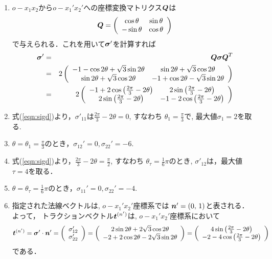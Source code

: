 \documentclass[10pt,a4j]{jarticle}
\begin{document}
\begin{enumerate}
\item
$o-x_1x_2$から$o-x_1'x_2'$への座標変換マトリクス$\mbox{\boldmath $Q$}$は
\[
	\mbox{\boldmath $Q$}=\left(
		\begin{array}{cc}
			\cos \theta & \sin \theta \\
			-\sin\theta & \cos \theta
		\end{array}
	\right)
\]
で与えられる．これを用いて$\mbox{\boldmath $\sigma$}'$を計算すれば
\begin{eqnarray}
	\mbox{\boldmath $\sigma$} ' 
	&=& 
	\mbox{\boldmath $Q \sigma Q$}^T\\
	&=&
	2
 	\left( 
 	\begin{array}{cc}
		-1- \cos 2\theta+\sqrt{3} \sin 2 \theta & 
		\sin 2\theta +\sqrt{3} \cos 2\theta \\
		\sin 2\theta +\sqrt{3} \cos 2\theta &
		-1+ \cos 2\theta-\sqrt{3} \sin 2 \theta 
	\end{array}
	\right) \\
 &=&
 2
 \left(
 	\begin{array}{cc}
		-1+ 2 \cos \left( \frac{2\pi}{3} -2\theta\right) & 
		2\sin \left(\frac{2\pi}{3} -2 \theta\right) \\
		2\sin \left(\frac{2\pi}{3} -2 \theta\right) &
		-1- 2 \cos \left( \frac{2\pi}{3} -2\theta\right)   \\
 	\end{array}
 \right)
	\label{eqn:sigd}
\end{eqnarray}
\item
	式(\ref{eqn:sigd})より，$\sigma'_{11}$は$\frac{2\pi}{3} -2\theta=0$, すなわち
	$\theta_1=\frac{\pi}{3}$で, 最大値$\sigma_1=2$を取る.
\item
	$\theta=\theta_1=\frac{\pi}{3}$のとき，$\sigma_{12}'=0,\sigma_{22}'=-6$.
\item
	式(\ref{eqn:sigd})より，$\frac{2\pi}{3}-2\theta=\frac{\pi}{2}$, すなわち
	$\theta_\tau=\frac{1}{6}\pi$のとき, $\sigma'_{12}$は，最大値$\tau=4$を取る．
\item
	$\theta=\theta_{\tau}=\frac{1}{6}\pi$のとき，$\sigma_{11}'=0,\sigma_{22}'=-4$.
\item
	指定された法線ベクトルは, $o-x_1'x_2'$座標系では
	$\mbox{\boldmath $n$}'=(0,\, 1)$と表される． よって，
	トラクションベクトル$\mbox{\boldmath $t$}^{(n')}$は, $o-x_1'x_2'$座標系において
	\begin{equation}
		\mbox{\boldmath $t$}^{(n')}= \mbox{\boldmath $\sigma$}' \cdot \mbox{\boldmath $n$}'
		= 
		\left( 
			\begin{array}{c} 
				\sigma_{12}' \\ 
				\sigma_{22}'
			\end{array}
		\right)
		=
		\left(
			\begin{array}{c}
				2\sin 2\theta +2\sqrt{3} \cos 2\theta \\
				-2+ 2\cos 2\theta-2\sqrt{3} \sin 2 \theta 
			\end{array}
		\right)
		=
		\left(
			\begin{array}{c}
			4\sin \left(\frac{2\pi}{3} -2 \theta\right)\\
			-2- 4 \cos \left( \frac{2\pi}{3} -2\theta\right)
 		\end{array}
		\right) 
	\end{equation}
	である．
\end{enumerate}
\end{document}
